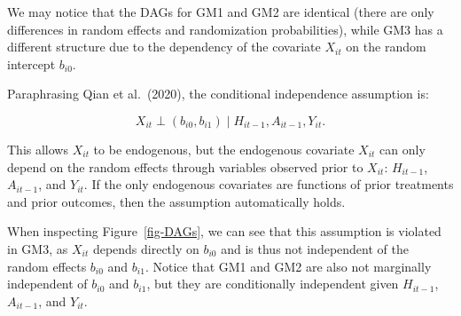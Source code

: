 \documentclass[
  12pt,
  a4paper,
]{article}
\begin{document}
\begin{figure}[H]
\begin{minipage}{0.50\linewidth}
{}

\end{minipage}%
\newline
\begin{minipage}{0.50\linewidth}



\end{minipage}%

\end{figure}%

We may notice that the DAGs for GM1 and GM2 are identical (there are
only differences in random effects and randomization probabilities),
while GM3 has a different structure due to the dependency of the
covariate \(X_{it}\) on the random intercept \(b_{i0}\).

Paraphrasing Qian et al.~(2020), the conditional independence assumption
is:

\[
X_{it} \perp (b_{i0}, b_{i1}) \mid H_{it-1}, A_{it-1}, Y_{it}.
\]

This allows \(X_{it}\) to be endogenous, but the endogenous covariate
\(X_{it}\) can only depend on the random effects through variables
observed prior to \(X_{it}\): \(H_{it-1}\), \(A_{it-1}\), and
\(Y_{it}\). If the only endogenous covariates are functions of prior
treatments and prior outcomes, then the assumption automatically holds.

When inspecting Figure~\ref{fig-DAGs}, we can see that this assumption
is violated in GM3, as \(X_{it}\) depends directly on \(b_{i0}\) and is
thus not independent of the random effects \(b_{i0}\) and \(b_{i1}\).
Notice that GM1 and GM2 are also not marginally independent of
\(b_{i0}\) and \(b_{i1}\), but they are conditionally independent given
\(H_{it-1}\), \(A_{it-1}\), and \(Y_{it}\).
\end{document}
